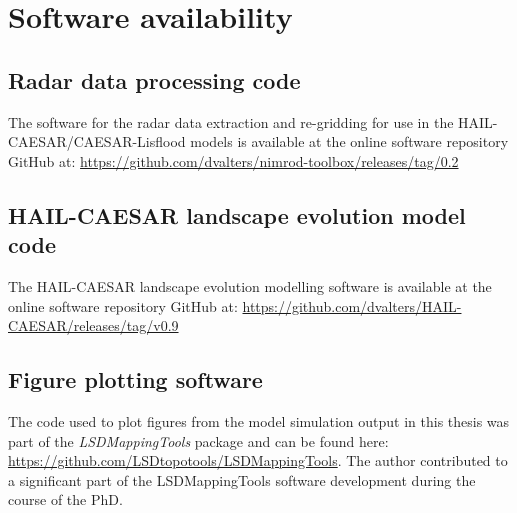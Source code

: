 
\chapter{Software availability}
\label{appendix_software}

\section{Radar data processing code}
The software for the radar data extraction and re-gridding for use in the HAIL-CAESAR/CAESAR-Lisflood models is available at the online software repository GitHub at: \url{https://github.com/dvalters/nimrod-toolbox/releases/tag/0.2}

\section{HAIL-CAESAR landscape evolution model code}
The HAIL-CAESAR landscape evolution modelling software is available at the online software repository GitHub at: \url{https://github.com/dvalters/HAIL-CAESAR/releases/tag/v0.9}

\section{Figure plotting software}
The code used to plot figures from the model simulation output in this thesis was part of the \textit{LSDMappingTools} package and can be found here: \url{https://github.com/LSDtopotools/LSDMappingTools}. The author contributed to a significant part of the LSDMappingTools software development during the course of the PhD.

